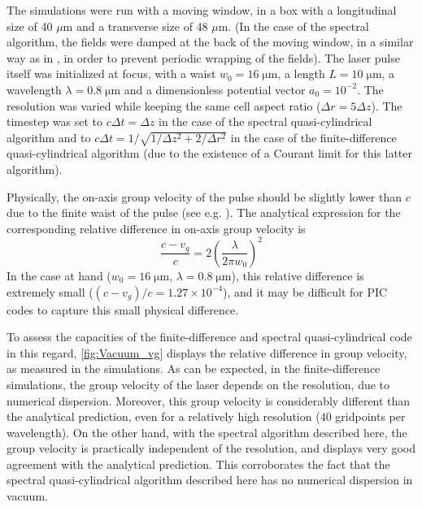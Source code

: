 \documentclass[1p,times]{elsarticle}
\begin{document}
The simulations were run with a moving window, in a box with a
longitudinal size of 40 $\mu$m and a transverse size of 48 $\mu$m. (In
the case of the spectral algorithm, the fields were damped at the back
of the moving window, in a similar way as in \citep{YuIPAC2015}, in
order to prevent periodic wrapping of the fields).
The laser pulse itself was initialized at focus, with a waist 
$w_0 = 16 \;\mathrm{\mu m}$, a length $L = 10 \; \mathrm{\mu m}$,
a wavelength $\lambda = 0.8 \; \mathrm{\mu m}$ and a 
dimensionless potential vector $a_0 = 10^{-2}$.
The resolution was varied while keeping the same cell aspect ratio ($\Delta r = 5\Delta z$). The
timestep was set to $c\Delta t = \Delta z$ in the case of the spectral
quasi-cylindrical algorithm and to $c\Delta t = 1/\sqrt{1/\Delta z^2 +
  2/\Delta r^2}$ in the case of the finite-difference
quasi-cylindrical algorithm (due to the existence of a Courant
limit for this latter algorithm). 

Physically, the on-axis group velocity of the pulse should be slightly lower than $c$ due
to the finite waist of the pulse (see e.g. \citep{Esarey1999}). The
analytical expression for the corresponding relative
difference in on-axis group velocity is
\begin{equation} 
\label{eq:vacuum_vg}
\frac{c-v_g}{c} = 2\left( \frac{\lambda}{2\pi w_0} \right)^2
\end{equation}
\noindent In the case at hand ($w_0=16\;\mathrm{\mu m}$,
$\lambda=0.8\;\mathrm{\mu m}$), this relative difference is extremely
small ($(c-v_g)/c = 1.27 \times 10^{-4}$), and it may be difficult for
PIC codes to capture this small physical difference. 

To assess the capacities of the finite-difference and
spectral quasi-cylindrical code in this regard, \cref{fig:Vacuum_vg} displays the relative
difference in group velocity, as measured in the
simulations. As can be expected, in the
finite-difference simulations, the
group velocity of the laser depends on the resolution, due to numerical
dispersion. 
Moreover, this group velocity is considerably different than the analytical
prediction, even for a relatively high resolution (40 gridpoints per
wavelength). On the other hand, with the spectral algorithm described
here, the group velocity is practically independent of the resolution, and
displays very good agreement with the analytical prediction. 
This corroborates the fact that the spectral quasi-cylindrical algorithm
described here has no numerical dispersion in vacuum.
\end{document}
